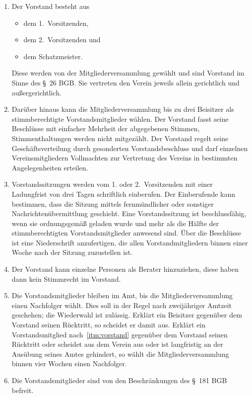 \documentclass[a4paper, 10pt, headings=normal]{scrartcl}
\begin{document}
\begin{multicols}{2}
\begin{enumerate}[label={(\arabic*)}]
	\item
		\label{itm:vorstand}
		Der Vorstand besteht aus
		\begin{itemize}[label={–}]
			\item
				dem 1.~Vorsitzenden,
			\item
				dem 2.~Vorsitzenden und
			\item
				dem Schatzmeister.
		\end{itemize}
		Diese werden von der Mitgliederversammlung gewählt und sind Vorstand im Sinne des §~26 BGB.
		Sie vertreten den Verein jeweils allein gerichtlich und außergerichtlich.
	\item
		Darüber hinaus kann die Mitgliederversammlung bis zu drei Beisitzer als stimmberechtigte Vorstandsmitglieder wählen.
		Der Vorstand fasst seine Beschlüsse mit einfacher Mehrheit der abgegebenen Stimmen, Stimmenthaltungen werden nicht mitgezählt.
		Der Vorstand regelt seine Geschäftsverteilung durch gesonderten Vorstandsbeschluss und darf einzelnen Vereinsmitgliedern Vollmachten zur Vertretung des Vereins in bestimmten Angelegenheiten erteilen.
	\item
		Vorstandssitzungen werden vom 1. oder 2.~Vorsitzenden mit einer Ladungfrist von drei Tagen schriftlich einberufen.
		Der Einberufende kann bestimmen, dass die Sitzung mittels fernmündlicher oder sonstiger Nachrichtenübermittlung geschieht.
		Eine Vorstandssitzung ist beschlussfähig, wenn sie ordnungsgemäß geladen wurde und mehr als die Hälfte der stimmberechtigten Vorstandsmitglieder anwesend sind.
		Über die Beschlüsse ist eine Niederschrift anzufertigen, die allen Vorstandmitgliedern binnen einer Woche nach der Sitzung zuzustellen ist.
	\item
		Der Vorstand kann einzelne Personen als Berater hinzuziehen, diese haben dann kein Stimmrecht im Vorstand.
	\item
		Die Vorstandsmitglieder bleiben im Amt, bis die Mitgliederversammlung einen Nachfolger wählt.
		Dies soll in der Regel nach zweijähriger Amtzeit geschehen; die Wiederwahl ist zulässig.
		Erklärt ein Beisitzer gegenüber dem Vorstand seinen Rücktritt, so scheidet er damit aus.
		Erklärt ein Vorstandsmitglied nach~\ref{itm:vorstand} gegenüber dem Vorstand seinen Rücktritt oder scheidet aus dem Verein aus oder ist langfristig an der Ausübung seines Amtes gehindert, so wählt die Mitgliederversammlung binnen vier Wochen einen Nachfolger.
	\item
		Die Vorstandsmitglieder sind von den Beschränkungen des §~181 BGB befreit.
\end{enumerate}


\end{multicols}
\end{document}
